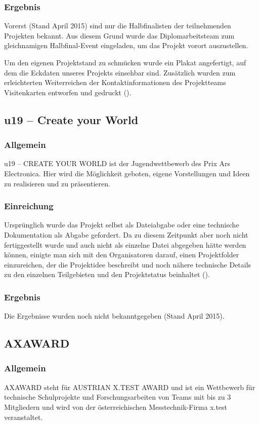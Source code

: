 \subsubsection{Ergebnis}
Vorerst (Stand April 2015) sind nur die Halbfinalisten der teilnehmenden Projekten bekannt.
Aus diesem Grund wurde das Diplomarbeitsteam
zum gleichnamigen Halbfinal-Event eingeladen, um das Projekt vorort auszustellen.

Um den eigenen Projektstand zu schmücken wurde ein Plakat angefertigt, auf dem die Eckdaten unseres
Projekts einsehbar sind.
Zusätzlich wurden zum erleichterten Weiterreichen der Kontaktinformationen des Projektteams Visitenkarten
entworfen und gedruckt ().

\subsection{u19 -- Create your World}
\subsubsection{Allgemein}
u19 – CREATE YOUR WORLD ist der Jugendwettbewerb des \gls{Prix Ars Electronica}.
Hier wird die Möglichkeit geboten, eigene Vorstellungen und Ideen zu realisieren und zu präsentieren.

\subsubsection{Einreichung}
Ursprünglich wurde das Projekt selbst als Dateiabgabe oder eine technische Dokumentation als Abgabe gefordert. Da \sblit zu diesem Zeitpunkt
aber noch nicht fertiggestellt wurde und auch nicht als einzelne Datei abgegeben hätte werden können,
einigte man sich mit den Organisatoren darauf, einen Projektfolder einzureichen, der die Projektidee
beschreibt und noch nähere technische Details zu den einzelnen Teilgebieten und den Projektstatus beinhaltet ().


\subsubsection{Ergebnis}
Die Ergebnisse wurden noch nicht bekanntgegeben (Stand April 2015).

\subsection{AXAWARD}
\subsubsection{Allgemein}
AXAWARD steht für AUSTRIAN X.TEST AWARD und ist ein Wettbewerb für technische Schulprojekte und Forschungsarbeiten
von Teams mit bis zu 3 Mitgliedern und wird von der österreichischen Messtechnik-Firma x.test veranstaltet.


